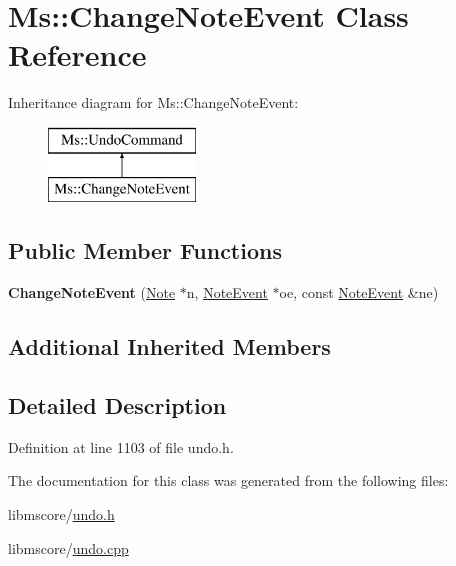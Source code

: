 \hypertarget{class_ms_1_1_change_note_event}{}\section{Ms\+:\+:Change\+Note\+Event Class Reference}
\label{class_ms_1_1_change_note_event}
Inheritance diagram for Ms\+:\+:Change\+Note\+Event\+:\begin{figure}[H]
\begin{center}
\leavevmode
\includegraphics[height=2.000000cm]{class_ms_1_1_change_note_event}
\end{center}
\end{figure}
\subsection*{Public Member Functions}
\begin{DoxyCompactItemize}
\item 
\mbox{\label{class_ms_1_1_change_note_event_aa1e9d43cee96eefb99947c562575fc5d}} 
{\bfseries Change\+Note\+Event} (\hyperlink{class_ms_1_1_note}{Note} $\ast$n, \hyperlink{class_ms_1_1_note_event}{Note\+Event} $\ast$oe, const \hyperlink{class_ms_1_1_note_event}{Note\+Event} \&ne)
\end{DoxyCompactItemize}
\subsection*{Additional Inherited Members}


\subsection{Detailed Description}


Definition at line 1103 of file undo.\+h.



The documentation for this class was generated from the following files\+:\begin{DoxyCompactItemize}
\item 
libmscore/\hyperlink{undo_8h}{undo.\+h}\item 
libmscore/\hyperlink{undo_8cpp}{undo.\+cpp}\end{DoxyCompactItemize}
